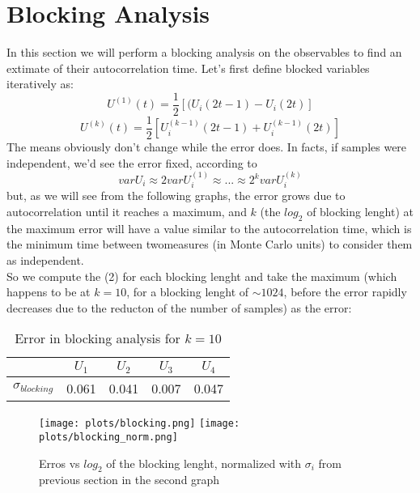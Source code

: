 \documentclass{article}
\begin{document}
\section{Blocking Analysis}
In this section we will perform a blocking analysis on the observables to find an extimate of their
autocorrelation time. Let's first define blocked variables iteratively as:
\begin{equation}
U^{(1)}(t) = \frac{1}{2}[(U_i(2t-1)-U_i(2t)]
\end{equation}
\begin{equation}
U^{(k)}(t)=\frac{1}{2}[U_i^{(k-1)}(2t-1)+U_i^{(k-1)}(2t)]
\end{equation}
The means obviously don't change while the error does. In facts, if samples were independent,
we'd see the error fixed, according to
\begin{equation}
var U_i\approx 2var U_i^{(1)}\approx ... \approx 2^kvar U_i^{(k)}
\end{equation}
but, as we will see from the following graphs, the error grows due to autocorrelation until it reaches a maximum,
and $k$ (the $log_2$ of blocking lenght) at the maximum error will have a value
similar to the autocorrelation time, which is the minimum time between twomeasures (in Monte Carlo
units) to consider them as independent.\\
So we compute the (2) for each blocking lenght and take the maximum (which
happens to be at $k = 10$, for a blocking lenght of $\sim1024$, before the error rapidly decreases due to
the reducton of the number of samples) as the error:
\begin{table}[ht]
\centering
\begin{tabular}{|c|c|c|c|c|}
\hline
& $U_1$ & $U_2$ & $U_3$ & $U_4$ \\
\hline
$\sigma_{blocking}$ & 0.061 & 0.041 & 0.007 & 0.047 \\
\hline
\end{tabular}
\caption{Error in blocking analysis for $k=10$}
\end{table}

\begin{figure}[h!]
\centering
\texttt{[image: plots/blocking.png]}%
\texttt{[image: plots/blocking\_norm.png]}
\caption{Erros vs $log_2$ of the blocking lenght, normalized with $\sigma_i$ from previous section in
the second graph}
\end{figure}
\end{document}
